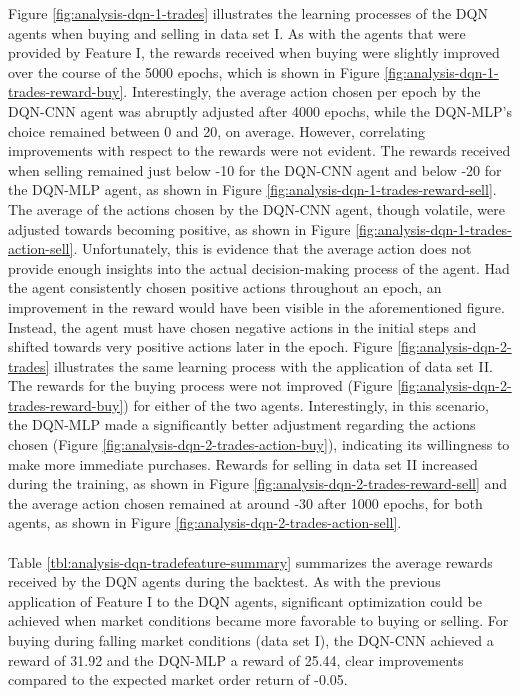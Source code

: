 Figure \ref{fig:analysis-dqn-1-trades} illustrates the learning processes of the DQN agents when buying and selling in data set I.
As with the agents that were provided by Feature I, the rewards received when buying were slightly improved over the course of the 5000 epochs, which is shown in Figure \ref{fig:analysis-dqn-1-trades-reward-buy}.
Interestingly, the average action chosen per epoch by the DQN-CNN agent was abruptly adjusted after 4000 epochs, while the DQN-MLP's choice remained between 0 and 20, on average.
However, correlating improvements with respect to the rewards were not evident.
The rewards received when selling remained just below -10 for the DQN-CNN agent and below -20 for the DQN-MLP agent, as shown in Figure \ref{fig:analysis-dqn-1-trades-reward-sell}.
The average of the actions chosen by the DQN-CNN agent, though volatile, were adjusted towards becoming positive, as shown in Figure \ref{fig:analysis-dqn-1-trades-action-sell}.
Unfortunately, this is evidence that the average action does not provide enough insights into the actual decision-making process of the agent.
Had the agent consistently chosen positive actions throughout an epoch, an improvement in the reward would have been visible in the aforementioned figure.
Instead, the agent must have chosen negative actions in the initial steps and shifted towards very positive actions later in the epoch.
Figure \ref{fig:analysis-dqn-2-trades} illustrates the same learning process with the application of data set II.
The rewards for the buying process were not improved (Figure \ref{fig:analysis-dqn-2-trades-reward-buy}) for either of the two agents.
Interestingly, in this scenario, the DQN-MLP made a significantly better adjustment regarding the actions chosen (Figure \ref{fig:analysis-dqn-2-trades-action-buy}), indicating its willingness to make more immediate purchases.
Rewards for selling in data set II increased during the training, as shown in Figure \ref{fig:analysis-dqn-2-trades-reward-sell} and the average action chosen remained at around -30 after 1000 epochs, for both agents, as shown in Figure \ref{fig:analysis-dqn-2-trades-action-sell}.
\\
\\
Table \ref{tbl:analysis-dqn-tradefeature-summary} summarizes the average rewards received by the DQN agents during the backtest.
As with the previous application of Feature I to the DQN agents, significant optimization could be achieved when market conditions became more favorable to buying or selling.
For buying during falling market conditions (data set I), the DQN-CNN achieved a reward of 31.92 and the DQN-MLP a reward of 25.44, clear improvements compared to the expected market order return of -0.05.
